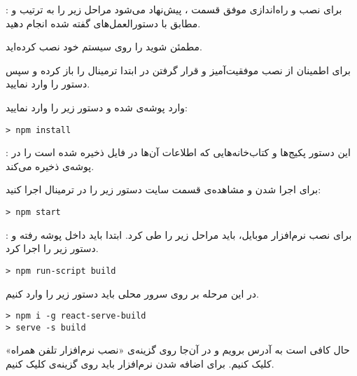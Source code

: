 
	 : برای نصب و راه‌اندازی موفق قسمت ، پیش‌نهاد می‌شود مراحل زیر را به ترتیب و مطابق با دستورالعمل‌های گفته شده انجام دهید.
	
		 مطمئن شوید  را روی سیستم خود نصب کرده‌اید.
		
		 برای اطمینان از نصب موفقیت‌آمیز و قرار گرفتن  در  ابتدا ترمینال را باز کرده و سپس دستور  را وارد نمایید.
		
		 وارد پوشه‌ی  شده و دستور زیر را وارد نمایید:
		\begin{latin}
			\begin{verbatim}
> npm install
			\end{verbatim}
		\end{latin}
	
	
	: این دستور پکیج‌ها و کتاب‌خانه‌هایی که اطلاعات آن‌ها در فایل  ذخیره شده است را در پوشه‌ی  ذخیره می‌کند.
	
		  برای اجرا شدن و مشاهده‌ی قسمت  سایت دستور زیر را در ترمینال اجرا کنید:
		\begin{latin}
			\begin{verbatim}
> npm start
			\end{verbatim}
		\end{latin}
	 : برای نصب نرم‌افزار موبایل، باید مراحل زیر را طی کرد.
			 ابتدا باید داخل پوشه  رفته و دستور زیر را اجرا کرد.
		\begin{latin}
			\begin{verbatim}
> npm run-script build
			\end{verbatim}
		\end{latin}
			 در این مرحله بر روی سرور محلی  باید دستور زیر را وارد کنیم.
		\begin{latin}
			\begin{verbatim}
> npm i -g react-serve-build
> serve -s build
			\end{verbatim}
		\end{latin}
			 حال کافی است به آدرس  برویم و در آن‌جا روی گزینه‌ی «نصب نرم‌افزار تلفن همراه» کلیک کنیم.
			 برای اضافه شدن نرم‌افزار باید روی گزینه‌ی  کلیک کنیم.
